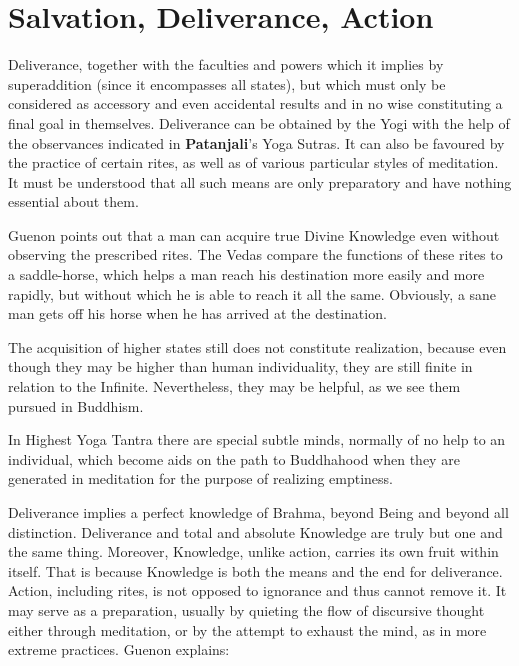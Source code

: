\section{Salvation, Deliverance, Action}
\begin{quotex}
Deliverance, together with the faculties and powers which it implies by superaddition (since it encompasses all states), but which must only be considered as accessory and even accidental results and in no wise constituting a final goal in themselves. Deliverance can be obtained by the Yogi with the help of the observances indicated in \textbf{Patanjali}'s Yoga Sutras. It can also be favoured by the practice of certain rites, as well as of various particular styles of meditation. It must be understood that all such means are only preparatory and have nothing essential about them.

\end{quotex}
Guenon points out that a man can acquire true Divine Knowledge even without observing the prescribed rites. The Vedas compare the functions of these rites to a saddle-horse, which helps a man reach his destination more easily and more rapidly, but without which he is able to reach it all the same. Obviously, a sane man gets off his horse when he has arrived at the destination.

The acquisition of higher states still does not constitute realization, because even though they may be higher than human individuality, they are still finite in relation to the Infinite. Nevertheless, they may be helpful, as we see them pursued in Buddhism.

\begin{quotex}
In Highest Yoga Tantra there are special subtle minds, normally of no help to an individual, which become aids on the path to Buddhahood when they are generated in meditation for the purpose of realizing emptiness. 

\end{quotex}
Deliverance implies a perfect knowledge of Brahma, beyond Being and beyond all distinction. Deliverance and total and absolute Knowledge are truly but one and the same thing. Moreover, Knowledge, unlike action, carries its own fruit within itself. That is because Knowledge is both the means and the end for deliverance. Action, including rites, is not opposed to ignorance and thus cannot remove it. It may serve as a preparation, usually by quieting the flow of discursive thought either through meditation, or by the attempt to exhaust the mind, as in more extreme practices. Guenon explains:

